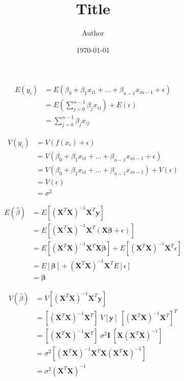\documentclass[11pt,a4paper,oldfontcommands]{memoir}
\title{Title}
\author{Author}
\date{\today}
\begin{document}
\begin{align*}
    E(y_i) &= E(\beta_0 + \beta_1x_{i1} + \dots + \beta_{n-1} x_{i n-1} + \epsilon)\\
    &= E\left(\sum_{j=0}^{n-1}\beta_{j}x_{ij}\right) + E(\epsilon)\\
    &= \sum_{j=0}^{n-1}\beta_{j}x_{ij}
\end{align*}

\begin{align*}
    V(y_i) &= V(f(x_i) + \epsilon)\\
    &= V(\beta_0 + \beta_1x_{i1} + \dots + \beta_{n-1} x_{i n-1} + \epsilon)\\
    &= V(\beta_0 + \beta_1x_{i1} + \dots + \beta_{n-1} x_{i n-1}) + V(\epsilon)\\
    &= V(\epsilon)\\
    &= \sigma^2
\end{align*}

\begin{align*}
    E(\hat \beta) &= E[(\boldsymbol{X}^T \boldsymbol{X})^{-1}\boldsymbol{X}^T \boldsymbol{y}]\\
    &= E[(\boldsymbol{X}^T\boldsymbol{X})^{-1} \boldsymbol{X}^T(\boldsymbol{X}\boldsymbol{\beta} + \epsilon)]\\
    &= E[(\boldsymbol{X}^T\boldsymbol{X})^{-1} \boldsymbol{X}^T\boldsymbol{X}\boldsymbol{\beta}] + 
    E[(\boldsymbol{X}^T\boldsymbol{X})^{-1} \boldsymbol{X}^T\epsilon]\\
    &=E[\boldsymbol{\beta}] + (\boldsymbol{X}^T\boldsymbol{X})^{-1} \boldsymbol{X}^TE[\epsilon]\\
    &= \boldsymbol{\beta}
\end{align*}

\begin{align*}
    V(\hat \beta) &= V[(\boldsymbol{X}^T\boldsymbol{X})^{-1} \boldsymbol{X}^T\boldsymbol{y}]\\
    &= [(\boldsymbol{X}^T\boldsymbol{X})^{-1} \boldsymbol{X}^T] \; V[\boldsymbol{y}] \;
    [(\boldsymbol{X}^T\boldsymbol{X})^{-1} \boldsymbol{X}^T]^T\\
    &= [(\boldsymbol{X}^T\boldsymbol{X})^{-1} \boldsymbol{X}^T] \; \sigma^2 \boldsymbol{I} \;
    [\boldsymbol{X}(\boldsymbol{X}^T\boldsymbol{X})^{-1}]\\
    &= \sigma^2 [(\boldsymbol{X}^T\boldsymbol{X})^{-1} \boldsymbol{X}^T
    \boldsymbol{X}(\boldsymbol{X}^T\boldsymbol{X})^{-1}]\\
    &= \sigma^2 (\boldsymbol{X}^T\boldsymbol{X})^{-1}
\end{align*}
\end{document}
